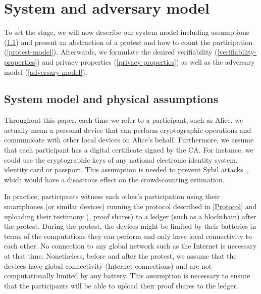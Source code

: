 \section{System and adversary model}%
\label{system-model}

To set the stage, we will now describe our system model including assumptions (\cref{assumptions}) and present an abstraction of a protest and how to
count the participation (\cref{protest-model}). 
Afterwards, we formulate the desired verifiability (\cref{verifiability-properties}) and privacy properties
(\cref{privacy-properties}) as well as the adversary model (\cref{adversary-model}).

\subsection{System model and physical assumptions}
\label{assumptions}

Throughout this paper, each time we refer to a participant, such as Alice, we actually mean a personal device that can perform cryptographic operations and communicate with other local devices on Alice's behalf. 
Furthermore, we assume that each participant has a digital certificate signed by the \ac{CA}.
For instance, we could use the cryptographic keys of any national electronic identity system, identity card or passport.
This assumption is needed to prevent Sybil attacks~\cite{SybilAttack}, which would have a disastrous effect on the crowd-counting estimation.

In practice, participants witness each other's participation using their smartphones (or similar devices) running the protocol described in \cref{Protocol} and uploading their testimony (\ie, proof shares) to a ledger (such as a blockchain) after the protest. 
During the protest, the devices might be limited by their batteries in terms of the computations they can perform and only have local connectivity to each other.
No connection to any global network such as the Internet is necessary at that time.  
Nonetheless, before and after the protest, we assume that the devices have global connectivity (\ie Internet connections) and are not computationally limited by any battery.
This assumption is necessary to ensure that the participants will be able to upload their proof shares to the ledger.

